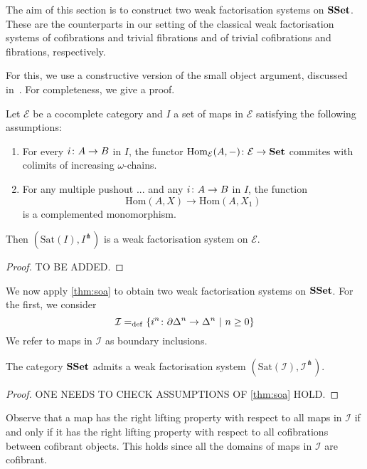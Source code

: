 \documentclass[reqno,10pt,a4paper,oneside,draft]{amsart}
\begin{document}
The aim of this section is to construct two weak factorisation systems on $\mathbf{SSet}$. These are the counterparts in our setting of the classical weak factorisation systems of cofibrations and trivial fibrations and of trivial cofibrations and fibrations, respectively. 

For this, we use a constructive version of the small object argument, discussed in~\cite{henry2018wms}. For completeness, we give a proof. 

\begin{lemma} \label{thm:soa} Let $\mathcal{E}$ be a cocomplete category and $I$ a set of maps in $\mathcal{E}$ satisfying the following assumptions:
\begin{enumerate}[$(i)$]
\item For every $i \colon A \to B$ in $I$, the functor $\mathrm{Hom}_\mathcal{E}(A, -) \colon \mathcal{E} \to
\mathbf{Set}$ commites with colimits of increasing $\omega$-chains.
\item For any multiple pushout ... and any $i \colon A \to B$ in $I$, the function
\[
\mathrm{Hom}(A, X) \to \mathrm{Hom}(A, X_1)
\]
is a complemented monomorphism.
\end{enumerate}
Then $(\mathrm{Sat}(I), I^\pitchfork)$ is a weak factorisation system on $\mathcal{E}$.
\end{lemma}

\begin{proof} TO BE ADDED.
\end{proof}


\bigskip




We now apply \cref{thm:soa} to obtain two weak factorisation systems on $\mathbf{SSet}$. For the first, 
we consider 
\[
\mathcal{I} =_{\operatorname{def}} \{ i^{n} \colon  \partial \Delta^{n} \to \Delta^{n} \ | \ n \geq 0 \}
\]
We refer to maps in $\mathcal{I}$ as boundary inclusions. 

\begin{proposition} The category $\mathbf{SSet}$ admits a weak factorisation system $(\mathrm{Sat}(\mathcal{I}), 
\mathcal{I}^\pitchfork)$.
\end{proposition}

\begin{proof} ONE NEEDS TO CHECK ASSUMPTIONS OF \cref{thm:soa} HOLD.
\end{proof}



Observe that  a map has the right lifting property with respect to all maps in $\mathcal{I}$
if and only if it has the right lifting property with respect to all cofibrations between cofibrant
objects. This holds since all the domains of maps in $\mathcal{I}$ are cofibrant.
\end{document}
